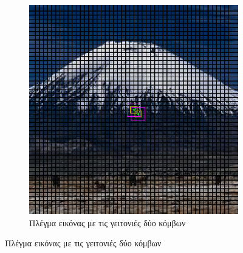 \begin{figure}
        \centering
        \begin{subfigure}[t]{0.7\textwidth}
                \centerline{\includegraphics[scale = 0.65]{./images/LFflow/rect_crop.png}}
                \caption{Πλέγμα εικόνας με τις γειτονιές δύο κόμβων}
        \end{subfigure}
		

\end{figure}
